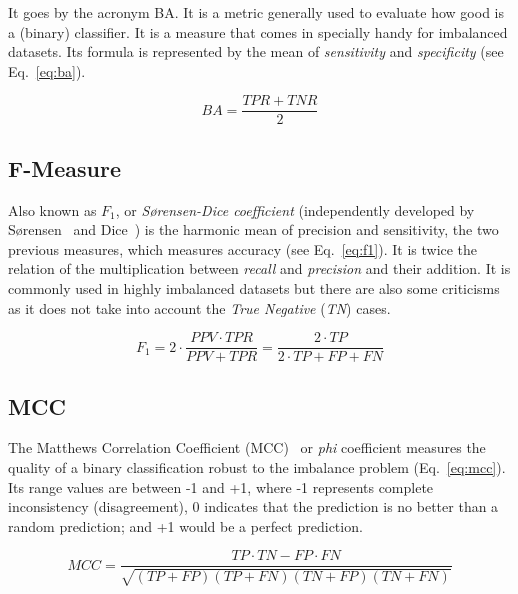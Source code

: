 It goes by the acronym BA. It is a metric generally used to evaluate how
good is a (binary) classifier. It is a measure that comes in specially 
handy for imbalanced datasets. Its formula is represented by the mean of
\textit{sensitivity} and \textit{specificity} (see Eq.~\ref{eq:ba}).

\begin{equation}\label{eq:ba}
    BA = \frac{TPR + TNR}{2}
\end{equation}
    
\subsection{F-Measure} 
 
Also known as $F_1$, or \textit{S\o rensen-Dice coefficient} (independently 
developed by S\o rensen~\cite{sorensen1948} and Dice~\cite{dice1945}) is the 
harmonic mean of precision and sensitivity, the two previous measures, which 
measures accuracy (see Eq.~\ref{eq:f1}). It is twice the relation of the 
multiplication between \textit{recall} and \textit{precision} and their 
addition. It is commonly used in highly imbalanced datasets but there are also 
some criticisms as it does not take into account the \textit{True Negative} 
(\textit{TN}) cases.

\begin{equation}\label{eq:f1}
    F_1 = 2 \cdot \frac{PPV \cdot TPR}{PPV + TPR} = \frac{2 \cdot TP}{2 \cdot TP + FP + FN}
\end{equation}
    
\subsection{MCC} 

The Matthews Correlation Coefficient (MCC)~\cite{Matthews1975} or \textit{phi} 
coefficient measures the quality of a binary classification robust to the 
imbalance problem (Eq.~\ref{eq:mcc}). Its range values are between -1 and +1, 
where -1 represents complete inconsistency (disagreement), 0 indicates that the 
prediction is no better than a random prediction; and +1 would be a perfect 
prediction.  

\begin{equation}\label{eq:mcc}
    MCC = \frac{TP \cdot TN - FP \cdot FN}{\sqrt{(TP + FP)(TP + FN)(TN + FP)(TN + FN)}}
\end{equation}

